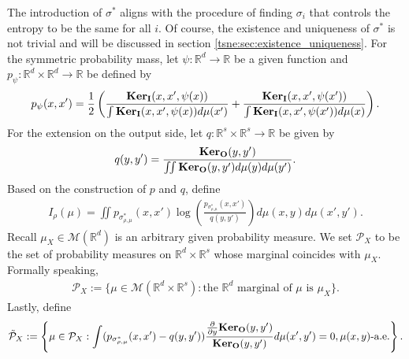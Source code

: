 The introduction of $\sigma^*$ aligns with the procedure of finding $\sigma_i$ that controls the entropy to be the same for all $i$. Of course, the existence and uniqueness of $\sigma^*$ is not trivial and will be discussed in section \ref{tsne:sec:existence_uniqueness}. For the symmetric probability mass, let $\psi: \mathbb{R}^d \to \mathbb{R}$ be a given function and $p_{\psi}: \mathbb{R}^d \times \mathbb{R}^d \to \mathbb{R}$ be defined by
\begin{align}
    p_{\psi}(x,x') = \frac{1}{2}\left( \frac{\mathbf{Ker}_{\mathbf{I}}(x,x',\psi(x))}{\int \mathbf{Ker}_{\mathbf{I}}(x,x',\psi(x))d\mu(x')} + \frac{\mathbf{Ker}_{\mathbf{I}}(x,x',\psi(x'))}{\int \mathbf{Ker}_{\mathbf{I}}(x,x',\psi(x'))d\mu(x)}\right).
\end{align}
For the extension on the output side, let $q: \mathbb{R}^s \times \mathbb{R}^s \to \mathbb{R}$ be given by
\begin{align}
    q(y,y') = \frac{\mathbf{Ker}_{\mathbf{O}}(y,y')}{\iint \mathbf{Ker}_{\mathbf{O}}(y,y')d\mu(y) d\mu(y')}.
\end{align}
Based on the construction of $p$ and $q$, define
\begin{align}
    I_{\rho}(\mu) = \iint p_{\sigma^*_{\rho,\mu}}(x,x') \log\left(\frac{p_{\sigma^*_{\rho,\mu}}(x,x')}{q(y,y')}\right) d\mu(x,y) d\mu(x',y').
\end{align}
Recall $\mu_X \in \mathcal{M}(\mathbb{R}^d)$ is an arbitrary given probability measure. We set $\mathcal{P}_X$ to be the set of probability measures on $\mathbb{R}^d \times \mathbb{R}^s$ whose marginal coincides with $\mu_X$. Formally speaking,
\begin{align}
    \mathcal{P}_X := \{\mu \in \mathcal{M}(\mathbb{R}^d \times \mathbb{R}^s): \text{the $\mathbb{R}^d$ marginal of $\mu$ is $\mu_X$}\}.
\end{align}
Lastly, define
\begin{align}
    \tilde{\mathcal{P}}_X := \left\{ \mu \in \mathcal{P}_X: \int (p_{\sigma^*_{\rho,\mu}}(x,x')-q(y,y'))\frac{\frac{\partial}{\partial y}\mathbf{Ker}_{\mathbf{O}}{(y,y')}}{\mathbf{Ker}_{\mathbf{O}}{(y,y')}} d\mu(x',y') = 0,\mu(x,y)\text{-a.e.}\right\}.
\end{align}
